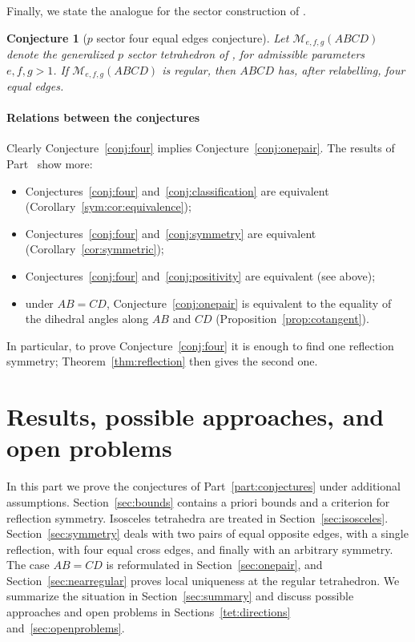 \documentclass[11pt]{article}
\newtheorem{conjecture}[theorem]{Conjecture}
\theoremstyle{definition}
\theoremstyle{remark}
\newcommand{\M}{\mathcal M}
\begin{document}
Finally, we state the analogue for the sector construction of \cite{TranActa}.

\begin{conjecture}[$p$ sector four equal edges conjecture]
\label{conj:psector} Let $\M_{e,f,g}(ABCD)$ denote the generalized $p$ sector tetrahedron of \cite[Theorem 6]{TranActa}, for admissible parameters $e,f,g>1$. If $\M_{e,f,g}(ABCD)$ is regular, then $ABCD$ has, after relabelling, four equal edges.
\end{conjecture}

\subsection*{Relations between the conjectures}

Clearly Conjecture~\ref{conj:four} implies Conjecture~\ref{conj:onepair}. The results of Part~\ref{part:results} show more:
\begin{itemize}
\item Conjectures~\ref{conj:four} and~\ref{conj:classification} are equivalent (Corollary~\ref{sym:cor:equivalence});
\item Conjectures~\ref{conj:four} and~\ref{conj:symmetry} are equivalent (Corollary~\ref{cor:symmetric});
\item Conjectures~\ref{conj:four} and~\ref{conj:positivity} are equivalent (see above);
\item under $AB=CD$, Conjecture~\ref{conj:onepair} is equivalent to the equality of the dihedral angles along $AB$ and $CD$ (Proposition~\ref{prop:cotangent}).
\end{itemize}
In particular, to prove Conjecture~\ref{conj:four} it is enough to find one reflection symmetry; Theorem~\ref{thm:reflection} then gives the second one.

\part{Results, possible approaches, and open problems}
\label{part:results}

In this part we prove the conjectures of Part~\ref{part:conjectures} under additional assumptions. Section~\ref{sec:bounds} contains a priori bounds and a criterion for reflection symmetry. Isosceles tetrahedra are treated in Section~\ref{sec:isosceles}. Section~\ref{sec:symmetry} deals with two pairs of equal opposite edges, with a single reflection, with four equal cross edges, and finally with an arbitrary symmetry. The case $AB=CD$ is reformulated in Section~\ref{sec:onepair}, and Section~\ref{sec:nearregular} proves local uniqueness at the regular tetrahedron. We summarize the situation in Section~\ref{sec:summary} and discuss possible approaches and open problems in Sections~\ref{tet:directions} and~\ref{sec:openproblems}.
\end{document}
